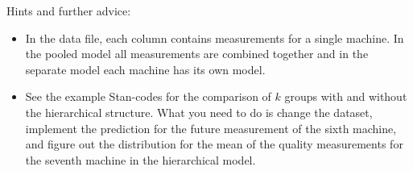\documentclass[a4paper,11pt]{article}
\begin{document}
\noindent Hints and further advice:
\begin{itemize}

\item In the data file, each column contains measurements for a single machine. In the pooled model all measurements are combined together and in the separate model each machine has its own model.
\item See the example Stan-codes for the comparison of $k$ groups with and without the hierarchical structure. What you need to do is change the dataset, implement the prediction for the future measurement of the sixth machine, and figure out the distribution for the mean of the quality measurements for the seventh machine in the hierarchical model.




\end{itemize}
\end{document}
